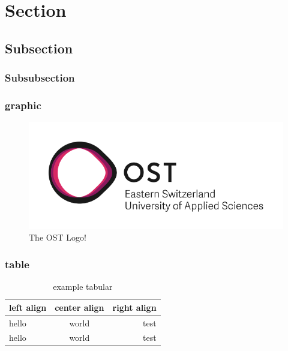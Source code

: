 

\section{Section}



\subsection{Subsection}


\subsubsection{Subsubsection}
\lipsum[1]



\subsubsection{graphic}
\begin{figure}[h]
    \centering
    \includegraphics[scale=0.5]{img/OST_Logo}
    \caption{The OST Logo!}\label{fig:figure}
\end{figure}

\subsubsection{table}
\begin{table}[h]
    \centering
    \caption{example tabular}
    \label{tab:example tabular}
    \begin{tabular}{l c r}
        \bfseries{left align} & \bfseries{center align} & \bfseries{right align}\\ \hline
        hello & world & test\\
        hello & world & test\\
    \end{tabular}
\end{table}


